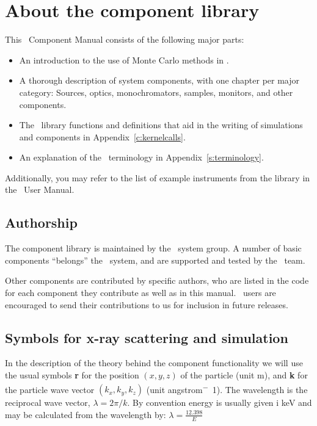 \chapter{About the component library}
\label{c:components}
This \MCX\ Component Manual consists of the following major parts:
\begin{itemize}
\item An introduction to the use of Monte Carlo methods in \MCX .
\item A thorough description of system components,
with one chapter per major category: Sources, optics,
monochromators, samples, monitors, and other components.
\item The \MCX\ library functions and definitions
  that aid in the writing of simulations and components in
  Appendix~\ref{c:kernelcalls}.
\item An explanation of the \MCX\ terminology in Appendix~\ref{s:terminology}.
\end{itemize}
Additionally, you may refer to the list of example instruments
from the library in the \MCX\ User Manual.

\section{Authorship}
The component library is
maintained by the \MCX\ system group. A number of basic components
``belongs'' the \MCX\ system, and are supported and tested by the \MCX\
team.

Other components are contributed
by specific authors, who are listed in the code for each component
they contribute as well as in this manual.
\MCX\ users are encouraged to send their
contributions to us for inclusion in future releases.


\section{Symbols for x-ray scattering and simulation}
In the description of the theory behind the component functionality
we will use the usual symbols {\bfseries r} for the position
$(x,y,z)$ of the particle (unit m), and {\bfseries k} for
the particle wave vector $(k_x, k_y, k_z)$ (unit \si{angstrom^-1}).
The wavelength is the reciprocal wave vector,
$\lambda=2 \pi / k$. By convention energy is usually given i \si{keV} and may be calculated from the wavelength by:
$\lambda=\frac{12.398}{E}$

